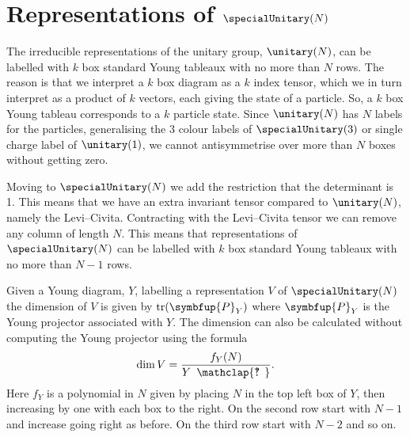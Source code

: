 \documentclass[fleqn]{NotesClass}
\newcommand{\projector}[1]{\symbfup{P}_{#1}}
\newcommand{\hooknumber}[1]{#1{\phantom{?}\mkern1mu\mathclap{\ooalign{\hfil ? \hfil \cr \hfil ! \hfil}}}}
\DeclareMathOperator{\tr}{tr}
\begin{document}
    \section{Representations of \texorpdfstring{\(\specialUnitary(N)\)}{SU(N)}}
    The irreducible representations of the unitary group, \(\unitary(N)\), can be labelled with \(k\) box standard Young tableaux with no more than \(N\) rows.
    The reason is that we interpret a \(k\) box diagram as a \(k\) index tensor, which we in turn interpret as a product of \(k\) vectors, each giving the state of a particle.
    So, a \(k\) box Young tableau corresponds to a \(k\) particle state.
    Since \(\unitary(N)\) has \(N\) labels for the particles, generalising the 3 colour labels of \(\specialUnitary(3)\) or single charge label of \(\unitary(1)\), we cannot antisymmetrise over more than \(N\) boxes without getting zero.
    
    Moving to \(\specialUnitary(N)\) we add the restriction that the determinant is 1.
    This means that we have an extra invariant tensor compared to \(\unitary(N)\), namely the Levi--Civita.
    Contracting with the Levi--Civita tensor we can remove any column of length \(N\).
    This means that representations of \(\specialUnitary(N)\) can be labelled with \(k\) box standard Young tableaux with no more than \(N - 1\) rows.
    
    Given a Young diagram, \(Y\), labelling a representation \(V\) of \(\specialUnitary(N)\) the dimension of \(V\) is given by \(\tr(\projector{Y})\) where \(\projector{Y}\) is the Young projector associated with \(Y\).
    The dimension can also be calculated without computing the Young projector using the formula
    \begin{equation}\label{eqn:dim of SU N rep}
        \dim V = \frac{f_Y(N)}{\hooknumber{Y}}.
    \end{equation}
    Here \(f_Y\) is a polynomial in \(N\) given by placing \(N\) in the top left box of \(Y\), then increasing by one with each box to the right.
    On the second row start with \(N - 1\) and increase going right as before.
    On the third row start with \(N - 2\) and so on.
    
\end{document}
